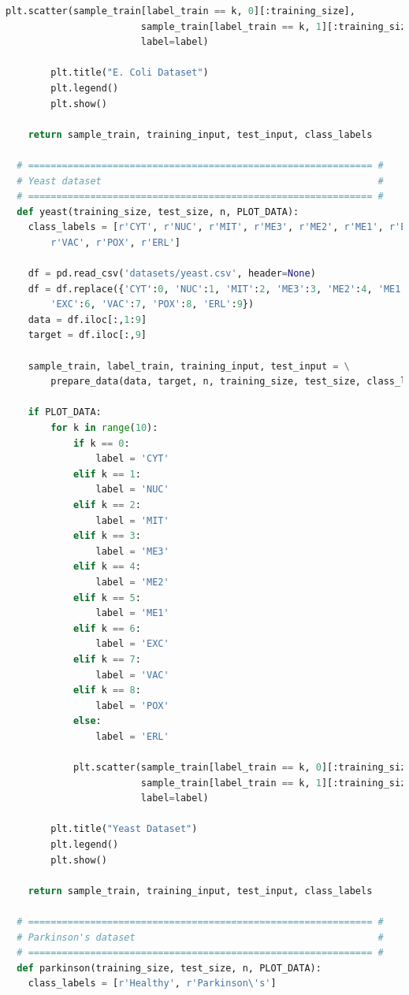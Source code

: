 \documentclass{article}
\begin{document}
\begin{lstlisting}[language=Python]
            plt.scatter(sample_train[label_train == k, 0][:training_size],
                        sample_train[label_train == k, 1][:training_size],
                        label=label)

        plt.title("E. Coli Dataset")
        plt.legend()
        plt.show()

    return sample_train, training_input, test_input, class_labels

  # ============================================================= #
  # Yeast dataset                                                 #
  # ============================================================= #
  def yeast(training_size, test_size, n, PLOT_DATA):
    class_labels = [r'CYT', r'NUC', r'MIT', r'ME3', r'ME2', r'ME1', r'EXC', \
        r'VAC', r'POX', r'ERL']

    df = pd.read_csv('datasets/yeast.csv', header=None)
    df = df.replace({'CYT':0, 'NUC':1, 'MIT':2, 'ME3':3, 'ME2':4, 'ME1':5, \
        'EXC':6, 'VAC':7, 'POX':8, 'ERL':9})
    data = df.iloc[:,1:9]
    target = df.iloc[:,9]

    sample_train, label_train, training_input, test_input = \
        prepare_data(data, target, n, training_size, test_size, class_labels)

    if PLOT_DATA:
        for k in range(10):
            if k == 0:
                label = 'CYT'
            elif k == 1:
                label = 'NUC'
            elif k == 2:
                label = 'MIT'
            elif k == 3:
                label = 'ME3'
            elif k == 4:
                label = 'ME2'
            elif k == 5:
                label = 'ME1'
            elif k == 6:
                label = 'EXC'
            elif k == 7:
                label = 'VAC'
            elif k == 8:
                label = 'POX'
            else:
                label = 'ERL'

            plt.scatter(sample_train[label_train == k, 0][:training_size],
                        sample_train[label_train == k, 1][:training_size],
                        label=label)

        plt.title("Yeast Dataset")
        plt.legend()
        plt.show()

    return sample_train, training_input, test_input, class_labels

  # ============================================================= #
  # Parkinson's dataset                                           #
  # ============================================================= #
  def parkinson(training_size, test_size, n, PLOT_DATA):
    class_labels = [r'Healthy', r'Parkinson\'s']


\end{lstlisting}
\end{document}
